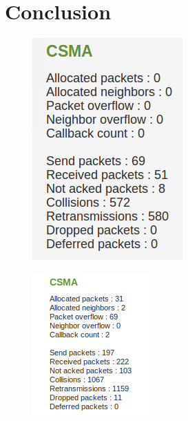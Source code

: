 \section{Conclusion}

\begin{figure}[!h]
	\begin{center} 	
		\includegraphics[width=0.8\linewidth]{csma}
		\caption{}
		\label{fig:csma}
	\end{center}
\end{figure} 

\begin{figure}[!h]
	\begin{center} 	
		\includegraphics[width=0.8\linewidth]{csma2}
		\caption{}
		\label{fig:csma1}
	\end{center}
\end{figure} 